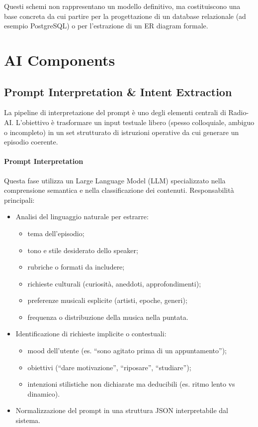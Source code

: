 \documentclass[11pt,a4paper]{article}
\begin{document}
Questi schemi non rappresentano un modello definitivo, ma costituiscono una base concreta da cui partire per la progettazione di un database relazionale (ad esempio PostgreSQL) o per l’estrazione di un ER diagram formale.
\section{AI Components}

\subsection{Prompt Interpretation \& Intent Extraction}

La pipeline di interpretazione del prompt è uno degli elementi centrali di Radio-AI.  
L’obiettivo è trasformare un input testuale libero (spesso colloquiale, ambiguo o incompleto) in un set strutturato di istruzioni operative da cui generare un episodio coerente.

\paragraph{Prompt Interpretation}

Questa fase utilizza un Large Language Model (LLM) specializzato nella comprensione semantica e nella classificazione dei contenuti.  
Responsabilità principali:
\begin{itemize}
    \item Analisi del linguaggio naturale per estrarre:
    \begin{itemize}
        \item tema dell’episodio;
        \item tono e stile desiderato dello speaker;
        \item rubriche o formati da includere;
        \item richieste culturali (curiosità, aneddoti, approfondimenti);
        \item preferenze musicali esplicite (artisti, epoche, generi);
        \item frequenza o distribuzione della musica nella puntata.
    \end{itemize}

    \item Identificazione di richieste implicite o contestuali:
    \begin{itemize}
        \item mood dell’utente (es. “sono agitato prima di un appuntamento”);
        \item obiettivi (“dare motivazione”, “riposare”, “studiare”);
        \item intenzioni stilistiche non dichiarate ma deducibili (es. ritmo lento vs dinamico).
    \end{itemize}

    \item Normalizzazione del prompt in una struttura JSON interpretabile dal sistema.
\end{itemize}
\end{document}
